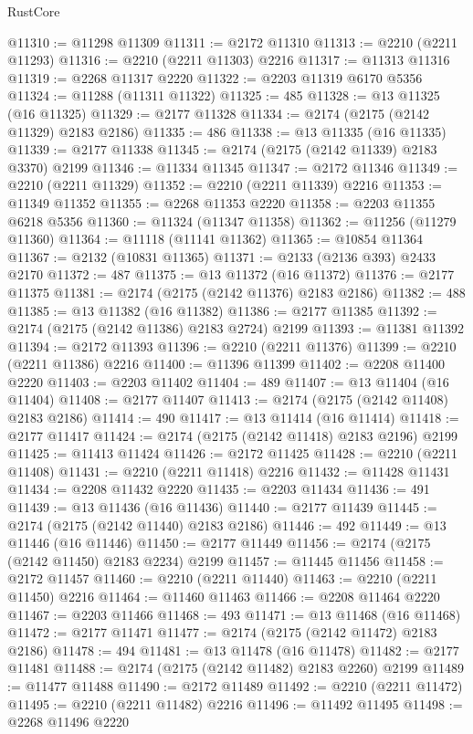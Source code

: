 \begin{lexlean}{RustCore}
\begin{coremodule}
@11310 := @11298 @11309
@11311 := @2172 @11310
@11313 := @2210 (@2211 @11293)
@11316 := @2210 (@2211 @11303) @2216
@11317 := @11313 @11316
@11319 := @2268 @11317 @2220
@11322 := @2203 @11319 @6170 @5356
@11324 := @11288 (@11311 @11322)
@11325 := 485
@11328 := @13 @11325 (@16 @11325)
@11329 := @2177 @11328
@11334 := @2174 (@2175 (@2142 @11329) @2183 @2186)
@11335 := 486
@11338 := @13 @11335 (@16 @11335)
@11339 := @2177 @11338
@11345 := @2174 (@2175 (@2142 @11339) @2183 @3370) @2199
@11346 := @11334 @11345
@11347 := @2172 @11346
@11349 := @2210 (@2211 @11329)
@11352 := @2210 (@2211 @11339) @2216
@11353 := @11349 @11352
@11355 := @2268 @11353 @2220
@11358 := @2203 @11355 @6218 @5356
@11360 := @11324 (@11347 @11358)
@11362 := @11256 (@11279 @11360)
@11364 := @11118 (@11141 @11362)
@11365 := @10854 @11364
@11367 := @2132 (@10831 @11365)
@11371 := @2133 (@2136 @393) @2433 @2170
@11372 := 487
@11375 := @13 @11372 (@16 @11372)
@11376 := @2177 @11375
@11381 := @2174 (@2175 (@2142 @11376) @2183 @2186)
@11382 := 488
@11385 := @13 @11382 (@16 @11382)
@11386 := @2177 @11385
@11392 := @2174 (@2175 (@2142 @11386) @2183 @2724) @2199
@11393 := @11381 @11392
@11394 := @2172 @11393
@11396 := @2210 (@2211 @11376)
@11399 := @2210 (@2211 @11386) @2216
@11400 := @11396 @11399
@11402 := @2208 @11400 @2220
@11403 := @2203 @11402
@11404 := 489
@11407 := @13 @11404 (@16 @11404)
@11408 := @2177 @11407
@11413 := @2174 (@2175 (@2142 @11408) @2183 @2186)
@11414 := 490
@11417 := @13 @11414 (@16 @11414)
@11418 := @2177 @11417
@11424 := @2174 (@2175 (@2142 @11418) @2183 @2196) @2199
@11425 := @11413 @11424
@11426 := @2172 @11425
@11428 := @2210 (@2211 @11408)
@11431 := @2210 (@2211 @11418) @2216
@11432 := @11428 @11431
@11434 := @2208 @11432 @2220
@11435 := @2203 @11434
@11436 := 491
@11439 := @13 @11436 (@16 @11436)
@11440 := @2177 @11439
@11445 := @2174 (@2175 (@2142 @11440) @2183 @2186)
@11446 := 492
@11449 := @13 @11446 (@16 @11446)
@11450 := @2177 @11449
@11456 := @2174 (@2175 (@2142 @11450) @2183 @2234) @2199
@11457 := @11445 @11456
@11458 := @2172 @11457
@11460 := @2210 (@2211 @11440)
@11463 := @2210 (@2211 @11450) @2216
@11464 := @11460 @11463
@11466 := @2208 @11464 @2220
@11467 := @2203 @11466
@11468 := 493
@11471 := @13 @11468 (@16 @11468)
@11472 := @2177 @11471
@11477 := @2174 (@2175 (@2142 @11472) @2183 @2186)
@11478 := 494
@11481 := @13 @11478 (@16 @11478)
@11482 := @2177 @11481
@11488 := @2174 (@2175 (@2142 @11482) @2183 @2260) @2199
@11489 := @11477 @11488
@11490 := @2172 @11489
@11492 := @2210 (@2211 @11472)
@11495 := @2210 (@2211 @11482) @2216
@11496 := @11492 @11495
@11498 := @2268 @11496 @2220

\end{coremodule}
\end{lexlean}
